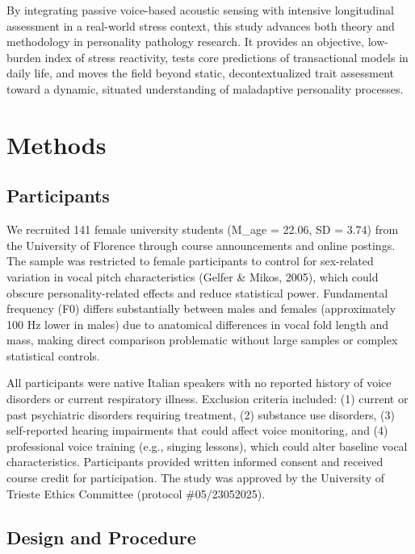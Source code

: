 \documentclass[
  english,
  man]{apa6}
\begin{document}
By integrating passive voice-based acoustic sensing with intensive longitudinal assessment in a real-world stress context, this study advances both theory and methodology in personality pathology research. It provides an objective, low-burden index of stress reactivity, tests core predictions of transactional models in daily life, and moves the field beyond static, decontextualized trait assessment toward a dynamic, situated understanding of maladaptive personality processes.

\section{Methods}\label{methods}

\subsection{Participants}\label{participants}

We recruited 141 female university students (M\_age = 22.06, SD = 3.74) from the University of Florence through course announcements and online postings. The sample was restricted to female participants to control for sex-related variation in vocal pitch characteristics (Gelfer \& Mikos, 2005), which could obscure personality-related effects and reduce statistical power. Fundamental frequency (F0) differs substantially between males and females (approximately 100 Hz lower in males) due to anatomical differences in vocal fold length and mass, making direct comparison problematic without large samples or complex statistical controls.

All participants were native Italian speakers with no reported history of voice disorders or current respiratory illness. Exclusion criteria included: (1) current or past psychiatric disorders requiring treatment, (2) substance use disorders, (3) self-reported hearing impairments that could affect voice monitoring, and (4) professional voice training (e.g., singing lessons), which could alter baseline vocal characteristics. Participants provided written informed consent and received course credit for participation. The study was approved by the University of Trieste Ethics Committee (protocol \#05/23052025).

\subsection{Design and Procedure}\label{design-and-procedure}
\end{document}
